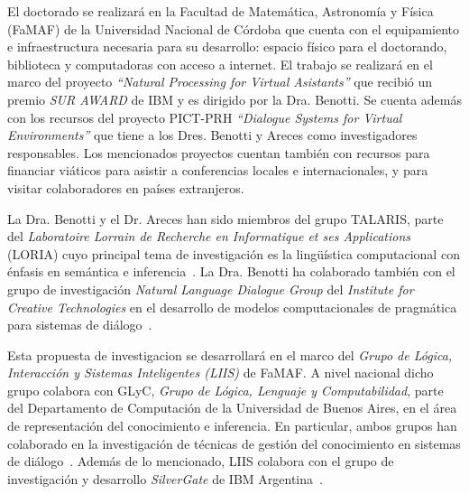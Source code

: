 \documentclass[10.9pt,a4paper]{article}
\begin{document}
El doctorado se realizar\'a en la Facultad de Matem\'atica, Astronom\'ia y 
F\'isica (FaMAF) de la Universidad Nacional de C\'ordoba que cuenta con el 
equipamiento e infraestructura necesaria para su desarrollo: espacio 
f\'isico para el doctorando, biblioteca y computadoras con acceso a 
internet.
El trabajo se realizar\'a en el marco del proyecto 
\emph{``Natural Processing for Virtual Asistants''} que recibi\'o un premio
\emph{SUR AWARD} de IBM y es dirigido por la Dra. Benotti. Se cuenta 
adem\'as con los recursos del proyecto PICT-PRH 
\emph{``Dialogue Systems for Virtual Environments''}
que tiene a los Dres. Benotti y Areces como investigadores responsables.
Los mencionados proyectos cuentan tambi\'en con recursos para financiar 
vi\'aticos para asistir a conferencias locales e internacionales, y para 
visitar colaboradores en pa\'ises extranjeros.

La Dra. Benotti y el Dr. Areces han sido miembros del grupo 
TALARIS, parte del \emph{Laboratoire Lorrain de Recherche en 
Informatique et ses Applications} (LORIA) cuyo principal tema de 
investigaci\'on es la ling\"u\'istica computacional con \'enfasis en 
sem\'antica e inferencia~\citep{arec:dial10}.
La Dra. Benotti ha colaborado tambi\'en con el grupo de investigaci\'on 
\emph{Natural Language Dialogue Group} del \emph{Institute for 
Creative Technologies} en el desarrollo de modelos computacionales de 
pragm\'atica para sistemas de di\'alogo~\citep{benotti09a}.

Esta propuesta de investigacion se desarrollar\'a en el marco del \emph{
Grupo de L\'ogica, Interacci\'on y Sistemas Inteligentes (LIIS)} de FaMAF.
A nivel nacional dicho grupo colabora con GLyC, \emph{Grupo de L\'ogica, 
Lenguaje y Computabilidad}, parte del Departamento de Computaci\'on de 
la Universidad de Buenos Aires, en el \'area de representaci\'on del 
conocimiento e inferencia. En particular, ambos grupos han colaborado en 
la investigaci\'on de t\'ecnicas de gesti\'on del conocimiento en sistemas de 
di\'alogo~\citep{arec:usin11}. Adem\'as de lo mencionado, LIIS colabora 
con el grupo de investigaci\'on y desarrollo \emph{SilverGate} de IBM 
Argentina~\cite{benotti-EtAl:2012:ACL2012short}.

\begin{spacing}{0.77}


\end{spacing}
\end{document}
